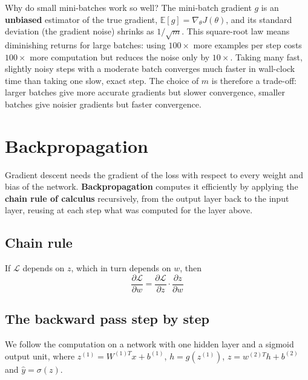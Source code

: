 Why do small mini-batches work so well? The mini-batch gradient $g$ is an
\textbf{unbiased} estimator of the true gradient,
$\mathbb{E}[g] = \nabla_\theta J(\theta)$, and its standard deviation (the gradient
noise) shrinks as $1/\sqrt{m}$. This square-root law means diminishing returns for
large batches: using $100\times$ more examples per step costs $100\times$ more
computation but reduces the noise only by $10\times$. Taking many fast, slightly
noisy steps with a moderate batch converges much faster in wall-clock time than
taking one slow, exact step. The choice of $m$ is therefore a trade-off: larger
batches give more accurate gradients but slower convergence, smaller batches give
noisier gradients but faster convergence.

\section{Backpropagation}
\label{sec:backprop}
Gradient descent needs the gradient of the loss with respect to every weight and
bias of the network. \textbf{Backpropagation} computes it efficiently by applying
the \textbf{chain rule of calculus} recursively, from the output layer back to the
input layer, reusing at each step what was computed for the layer above.

\subsection{Chain rule}
If $\mathcal{L}$ depends on $z$, which in turn depends on $w$, then
\begin{equation}
    \frac{\partial \mathcal{L}}{\partial w} = \frac{\partial \mathcal{L}}{\partial z} \cdot \frac{\partial z}{\partial w}
\end{equation}

\subsection{The backward pass step by step}
We follow the computation on a network with one hidden layer and a sigmoid output
unit, where
$z^{(1)} = W^{(1)T}x + b^{(1)}$, $h = g(z^{(1)})$, $z = w^{(2)T} h + b^{(2)}$ and
$\hat{y} = \sigma(z)$.

